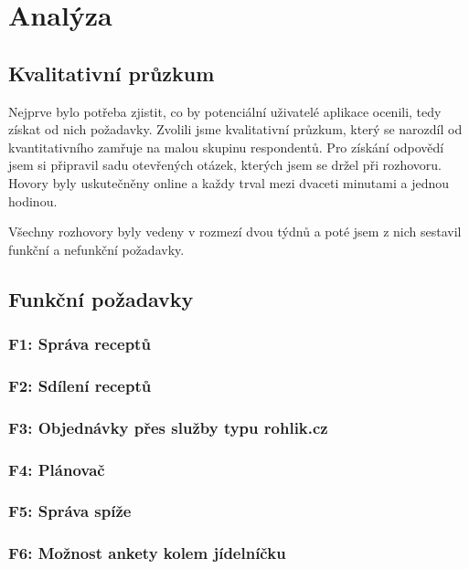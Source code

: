 
\chapter{Analýza}

\section{Kvalitativní průzkum}

Nejprve bylo potřeba zjistit, co by potenciální uživatelé aplikace ocenili, tedy získat od nich požadavky.
Zvolili jsme kvalitativní průzkum, který se narozdíl od kvantitativního zamřuje na malou skupinu respondentů.
Pro získání odpovědí jsem si připravil sadu otevřených otázek, kterých jsem se držel při rozhovoru. Hovory byly
uskutečněny online a každy trval mezi dvaceti minutami a jednou hodinou.

Všechny rozhovory byly vedeny v rozmezí dvou týdnů a poté jsem z nich sestavil funkční a nefunkční požadavky.

\section{Funkční požadavky}

\subsection{F1: Správa receptů}
\subsection{F2: Sdílení receptů}
\subsection{F3: Objednávky přes služby typu rohlik.cz}
\subsection{F4: Plánovač}
\subsection{F5: Správa spíže}
\subsection{F6: Možnost ankety kolem jídelníčku}

